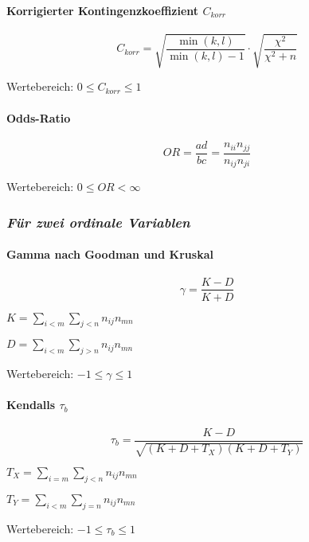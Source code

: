 \documentclass[10pt]{article}
\begin{document}
\begin{multicols}{2}
\paragraph{Korrigierter Kontingenzkoeffizient $C_{korr}$}

$$C_{korr}= \sqrt{\frac{\min(k,l)}{\min(k,l)-1}} \cdot \sqrt{\frac{\chi^2}{\chi^2 + n}} $$

Wertebereich: $ 0 \le C_{korr} \le 1 $

\paragraph{Odds-Ratio}

$$OR=\frac{ad}{bc} = \frac{n_{ii}n_{jj}}{n_{ij}n_{ji}}$$

Wertebereich: $0 \le OR < \infty$

\subsubsection*{\textit{Für zwei ordinale Variablen}}

\paragraph{Gamma nach Goodman und Kruskal}

$$\gamma=\frac{K-D}{K+D}$$


\begin{flushleft}
$ K=\sum_{i<m}\sum_{j<n}n_{ij}n_{mn}$

 $ D=\sum_{i<m}\sum_{j>n}n_{ij}n_{mn}$
\end{flushleft}

\vspace{0.2cm}

Wertebereich: $-1 \le \gamma \le 1$

\paragraph{Kendalls $\tau_b$}

$$ \tau_b=\frac{K-D}{\sqrt{(K+D+T_X)(K+D+T_Y)}}$$


\begin{flushleft}
  $ T_X=\sum_{i=m}\sum_{j<n}n_{ij}n_{mn}$ 

 $ T_Y=\sum_{i<m}\sum_{j=n}n_{ij}n_{mn}$
\end{flushleft}

\vspace{0.2cm}

Wertebereich: $-1 \le \tau_b \le 1$


\end{multicols}
\end{document}
